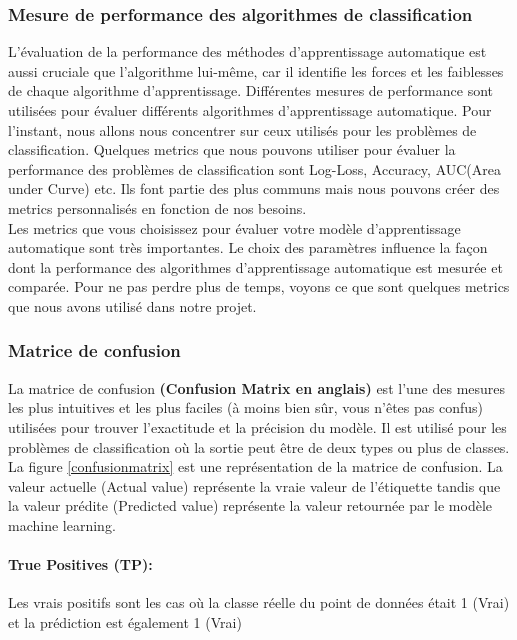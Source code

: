 \documentclass[12pt, french]{article}
\begin{document}
\subsubsection{Mesure de performance des algorithmes de classification}
L'évaluation de la performance des méthodes d'apprentissage automatique est aussi cruciale que l'algorithme lui-même, car il identifie les forces et les faiblesses de chaque algorithme d'apprentissage. Différentes mesures de performance sont utilisées pour évaluer différents algorithmes d'apprentissage automatique. Pour l'instant, nous allons nous concentrer sur ceux utilisés pour les problèmes de classification. Quelques metrics que nous pouvons utiliser pour évaluer la performance des problèmes de classification sont Log-Loss, Accuracy, AUC(Area under Curve) etc. Ils font partie des plus communs mais nous pouvons créer des metrics personnalisés en fonction de nos besoins.\\

Les metrics que vous choisissez pour évaluer votre modèle d'apprentissage automatique sont très importantes. Le choix des paramètres influence la façon dont la performance des algorithmes d'apprentissage automatique est mesurée et comparée. Pour ne pas perdre plus de temps, voyons ce que sont quelques metrics que nous avons utilisé dans notre projet.

\subsubsection{Matrice de confusion}
La matrice de confusion \textbf{(Confusion Matrix en anglais)} est l'une des mesures les plus intuitives et les plus faciles (à moins bien sûr, vous n'êtes pas confus) utilisées pour trouver l'exactitude et la précision du modèle. Il est utilisé pour les problèmes de classification où la sortie peut être de deux types ou plus de classes.\\

La figure \ref{confusionmatrix} est une représentation de la matrice de confusion. La valeur actuelle (Actual value) représente la vraie valeur de l'étiquette tandis que la valeur prédite (Predicted value) représente la valeur retournée par le modèle machine learning. 
\paragraph{True Positives (TP):}
Les vrais positifs sont les cas où la classe réelle du point de données était 1 (Vrai) et la prédiction est également 1 (Vrai)
\end{document}
